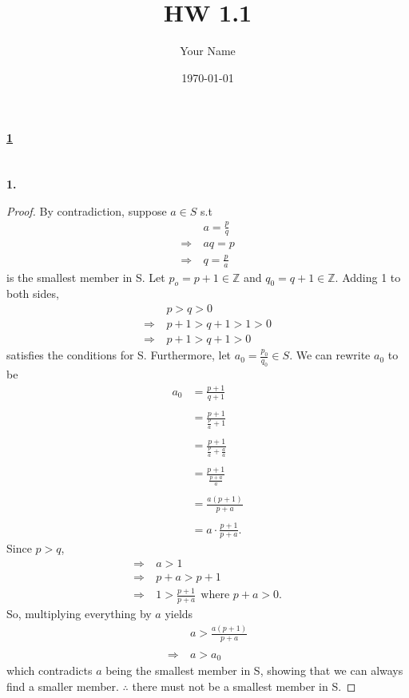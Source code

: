 \documentclass[12pt, letterpaper]{article}
\title{HW 1.1}
\author{Your Name}
\date{\today}
\begin{document}
\paragraph{\underline{1} \\ \\} 

\textbf{1.} 

\begin{proof}
    By contradiction, suppose $a \in S$ s.t
    \begin{align*}
        &a = \frac{p}{q} \\
       \Rightarrow \ &aq = p \\
    \Rightarrow \  &q = \frac{p}{a}
    \end{align*}
    is the smallest member in S. Let $p_{o} = p + 1 \in \mathbb{Z}$ and $q_{0} = q + 1 \in \mathbb{Z}$. Adding 1 to both sides, 
    \begin{align*}
        &p > q > 0 \\
        \Rightarrow \ &p + 1> q + 1> 1 > 0 \\
        \Rightarrow \ &p + 1 > q + 1 > 0
    \end{align*}
    satisfies the conditions for S. Furthermore, let $a_{0} = \frac{p_{0}}{q_{0}} \in S$. We can rewrite $a_{0}$ to be  
    \begin{align*}
        a_{0} &= \frac{p + 1}{q + 1} \\ \\
        &= \frac{p + 1}{\frac{p}{a} + 1} \\ \\
        &= \frac{p+1}{\frac{p}{a} + \frac{a}{a}} \\ \\
        &= \frac{p + 1}{\frac{p + a}{a}} \\ \\
        &= \frac{a(p+1)}{p + a} \\ \\
        &= a \cdot \frac{p + 1}{p+a}.
    \end{align*}
    Since $p > q$,
    \begin{align*}
    \Rightarrow \ &a > 1 \\
        \Rightarrow \ &p + a > p + 1 \\  
        \Rightarrow \ &1 > \frac{p+1}{p+a} \ \ \text{where $p + a > 0$}.
    \end{align*}
    So, multiplying everything by $a$ yields
    \begin{align*}
        &a > \frac{a(p+1)}{p + a} \\ \\
        \Rightarrow \ &a > a_{0} 
    \end{align*}
    which contradicts $a$ being the smallest member in S, showing that we can always find a smaller member. $\therefore$ there must not be a smallest member in S. 
\end{proof}
\end{document}
